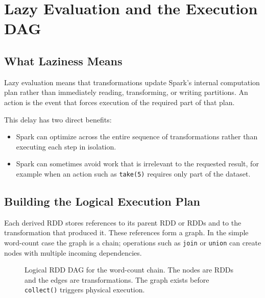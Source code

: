 \documentclass[11pt,a4paper,oneside]{book}
\begin{document}
\section{Lazy Evaluation and the Execution DAG}
\label{sec:spark-lazy-dag}

\subsection{What Laziness Means}

Lazy evaluation means that transformations update Spark's internal computation plan rather than immediately reading, transforming, or writing partitions. An action is the event that forces execution of the required part of that plan.

This delay has two direct benefits:

\begin{itemize}
    \item Spark can optimize across the entire sequence of transformations rather than executing each step in isolation.
    \item Spark can sometimes avoid work that is irrelevant to the requested result, for example when an action such as \texttt{take(5)} requires only part of the dataset.
\end{itemize}

\subsection{Building the Logical Execution Plan}

Each derived RDD stores references to its parent RDD or RDDs and to the transformation that produced it. These references form a graph. In the simple word-count case the graph is a chain; operations such as \texttt{join} or \texttt{union} can create nodes with multiple incoming dependencies.

\begin{figure}[htbp]
\centering
{}
\caption{Logical RDD DAG for the word-count chain. The nodes are RDDs and the edges are transformations. The graph exists before \texttt{collect()} triggers physical execution.}
\label{fig:wordcount-logical-dag}
\end{figure}
\end{document}
